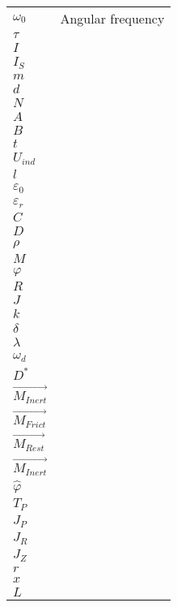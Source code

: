 \begin{table}[h]
    \begin{tabular}{@{}ll@{}}%
        \( \omega_0 \) & Angular frequency\\
        \(\tau\) & \\
        \( I \) & \\
        \( I_S \) & \\
        \( m \) & \\
        \( d \) & \\
        \( N \) & \\
        \( A \) & \\
        \( B \) & \\
        \( t \) & \\
        \( U_{ind} \) & \\
        \( l \) & \\
        \( \varepsilon_0 \) & \\
        \( \varepsilon_r \) & \\
        \( C \) & \\
        \( D \) & \\
        \( \rho \) & \\
        \( M \) & \\
        \( \varphi \) & \\
        \( R \) & \\
        \( J \) & \\
        \( k \) & \\
        \( \delta \) & \\
        \( \lambda \) & \\
        \( \omega_d \) & \\
        \( D^* \) & \\
        \( \vec{M_{Inert}} \) & \\
        \( \vec{M_{Frict}} \) & \\
        \( \vec{M_{Rest}} \) & \\
        \( \vec{M_{Inert}} \) & \\
        \( \hat{\varphi} \) & \\
        \( T_P \) & \\
        \( J_P \) & \\
        \( J_R \) & \\
        \( J_Z \) & \\
        \( r \) & \\
        \( x \) & \\
        \( L \) & \\

\end{tabular}
\end{table}
